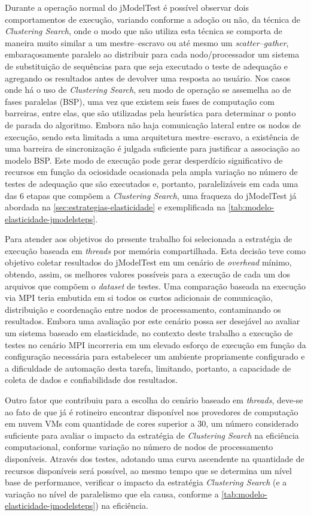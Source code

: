 \documentclass[english,brazilian]{UNISINOSmonografia} %
\begin{document}
Durante a operação normal do jModelTest é possível observar dois comportamentos de execução, variando conforme a adoção ou não, da técnica de \textit{Clustering Search}, onde o modo que não utiliza esta técnica se comporta de maneira muito similar a um mestre--escravo ou até mesmo um \textit{scatter--gather}, embaraçosamente paralelo ao distribuir para cada nodo/processador um sistema de substituição de sequências para que seja executado o teste de adequação e agregando os resultados antes de devolver uma resposta ao usuário.
Nos casos onde há o uso de \textit{Clustering Search}, seu modo de operação se assemelha ao de fases paralelas (BSP), uma vez que existem seis fases de computação com barreiras, entre elas, que são utilizadas pela heurística para determinar o ponto de parada do algoritmo.
Embora não haja comunicação lateral entre os nodos de execução, sendo esta limitada a uma arquitetura mestre--escravo, a existência de uma barreira de sincronização é julgada suficiente para justificar a associação ao modelo BSP.
Este modo de execução pode gerar desperdício significativo de recursos em função da ociosidade ocasionada pela ampla variação no número de testes de adequação que são executados e, portanto, paralelizáveis em cada uma das 6 etapas que compõem a \textit{Clustering Search}, uma fraqueza do jModelTest já abordada na \autoref{sec:estrategias-elasticidade} e exemplificada na \autoref{tab:modelo-elasticidade-jmodelsteps}.


Para atender aos objetivos do presente trabalho foi selecionada a estratégia de execução baseada em \textit{threads} por memória compartilhada.
Esta decisão teve como objetivo coletar resultados do jModelTest em um cenário de \textit{overhead} mínimo, obtendo, assim, os melhores valores possíveis para a execução de cada um dos arquivos que compõem o \textit{dataset} de testes.
Uma comparação baseada na execução via MPI teria embutida em si todos os custos adicionais de comunicação, distribuição e coordenação entre nodos de processamento, contaminando os resultados.
Embora uma avaliação por este cenário possa ser desejável ao avaliar um sistema baseado em elasticidade, no contexto deste trabalho a execução de testes no cenário MPI incorreria em um elevado esforço de execução em função da configuração necessária para estabelecer um ambiente propriamente configurado e a dificuldade de automação desta tarefa, limitando, portanto, a capacidade de coleta de dados e confiabilidade dos resultados.


Outro fator que contribuiu para a escolha do cenário baseado em \textit{threads}, deve-se ao fato de que já é rotineiro encontrar disponível nos provedores de computação em nuvem VMs com quantidade de cores superior a 30, um número considerado suficiente para avaliar o impacto da estratégia de \textit{Clustering Search} na eficiência computacional, conforme variação no número de nodos de processamento disponíveis.
Através dos testes, adotando uma curva ascendente na quantidade de recursos disponíveis será possível, ao mesmo tempo que se determina um nível base de performance, verificar o impacto da estratégia \textit{Clustering Search} (e a variação no nível de paralelismo que ela causa, conforme a \autoref{tab:modelo-elasticidade-jmodelsteps}) na eficiência.
\end{document}
